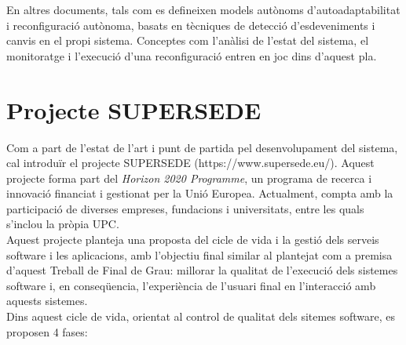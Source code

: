 En altres documents, tals com \cite{ibm} es defineixen models autònoms d’autoadaptabilitat i reconfiguració autònoma, basats en tècniques de detecció d’esdeveniments i canvis en el propi sistema. Conceptes com l’anàlisi de l’estat del sistema, el monitoratge i l’execució d’una reconfiguració entren en joc dins d’aquest pla.


\section{Projecte SUPERSEDE}

Com a part de l'estat de l'art i punt de partida pel desenvolupament del sistema, cal introduïr el projecte SUPERSEDE (https://www.supersede.eu/). Aquest projecte forma part del \textit{Horizon 2020 Programme}, un programa de recerca i innovació financiat i gestionat per la Unió Europea. Actualment, compta amb la participació de diverses empreses, fundacions i universitats, entre les quals s'inclou la pròpia UPC. \\

Aquest projecte planteja una proposta del cicle de vida i la gestió dels serveis software i les aplicacions, amb l'objectiu final similar al plantejat com a premisa d'aquest Treball de Final de Grau: millorar la qualitat de l'execució dels sistemes software i, en conseqüencia, l'experiència de l'usuari final en l'interacció amb aquests sistemes. \\

Dins aquest cicle de vida, orientat al control de qualitat dels sitemes software, es proposen 4 fases:

